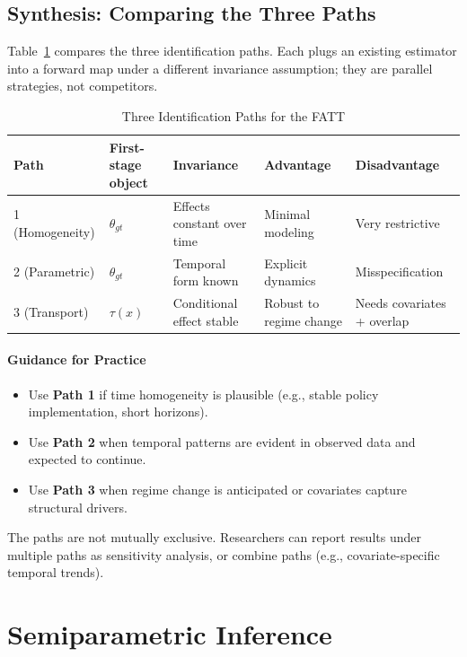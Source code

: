 \documentclass{article}
\begin{document}
\subsection{Synthesis: Comparing the Three Paths}
\label{sec:synthesis}

Table~\ref{tab:three-paths} compares the three identification paths. Each plugs an existing estimator into a forward map under a different invariance assumption; they are parallel strategies, not competitors.

\begin{table}[h]
\centering
\caption{Three Identification Paths for the FATT}
\label{tab:three-paths}
\begin{tabular}{lllll}
\toprule
Path & First-stage object & Invariance & Advantage & Disadvantage \\
\midrule
1 (Homogeneity) & $\theta_{gt}$ & Effects constant over time & Minimal modeling & Very restrictive \\
2 (Parametric) & $\theta_{gt}$ & Temporal form known & Explicit dynamics & Misspecification \\
3 (Transport) & $\tau(x)$ & Conditional effect stable & Robust to regime change & Needs covariates + overlap \\
\bottomrule
\end{tabular}
\end{table}

\paragraph{Guidance for Practice}

\begin{itemize}
\item Use \textbf{Path 1} if time homogeneity is plausible (e.g., stable policy implementation, short horizons).
\item Use \textbf{Path 2} when temporal patterns are evident in observed data and expected to continue.
\item Use \textbf{Path 3} when regime change is anticipated or covariates capture structural drivers.
\end{itemize}

The paths are not mutually exclusive. Researchers can report results under multiple paths as sensitivity analysis, or combine paths (e.g., covariate-specific temporal trends).


\section{Semiparametric Inference}
\label{sec:inference}
\end{document}
